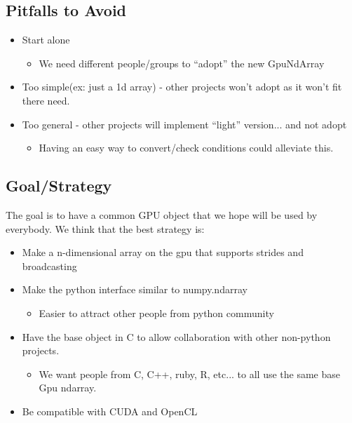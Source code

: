 \documentclass{article} %
\begin{document}

\subsection{Pitfalls to Avoid}
\begin{itemize}
\item Start alone
  \begin{itemize}
  \item We need different people/groups to ``adopt'' the new GpuNdArray
  \end{itemize}
\item Too simple(ex: just a 1d array) - other projects won't adopt as it won't fit there need.
\item Too general - other projects will implement ``light'' version... and not adopt
  \begin{itemize}
  \item Having an easy way to convert/check conditions could alleviate this.
  \end{itemize}
\end{itemize}

\subsection{Goal/Strategy}
The goal is to have a common GPU object that we hope will be used by everybody. We think that the best strategy is:

\begin{itemize}
\item Make a n-dimensional array on the gpu that supports strides and broadcasting
\item Make the python interface similar to numpy.ndarray
  \begin{itemize}
  \item Easier to attract other people from python community
  \end{itemize}
\item Have the base object in C to allow collaboration with other non-python projects.
  \begin{itemize}
  \item We want people from C, C++, ruby, R, etc... to all use the same base Gpu ndarray.
  \end{itemize}
\item Be compatible with CUDA and OpenCL
\end{itemize}
\end{document}
